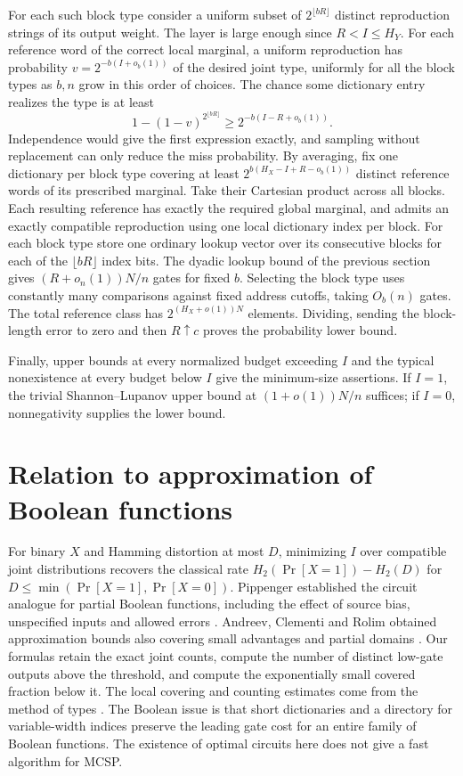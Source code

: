 \documentclass[11pt]{article}
\begin{document}
For each such block type consider a uniform subset of $2^{\lfloor bR\rfloor}$ distinct reproduction strings of its output weight. The layer is large enough since $R<I\le H_Y$. For each reference word of the correct local marginal, a uniform reproduction has probability $v=2^{-b(I+o_b(1))}$ of the desired joint type, uniformly for all the block types as $b,n$ grow in this order of choices. The chance some dictionary entry realizes the type is at least
\[
    1-(1-v)^{2^{\lfloor bR\rfloor}}\ge 2^{-b(I-R+o_b(1))}.
\]
Independence would give the first expression exactly, and sampling without replacement can only reduce the miss probability. By averaging, fix one dictionary per block type covering at least $2^{b(H_X-I+R-o_b(1))}$ distinct reference words of its prescribed marginal. Take their Cartesian product across all blocks. Each resulting reference has exactly the required global marginal, and admits an exactly compatible reproduction using one local dictionary index per block. For each block type store one ordinary lookup vector over its consecutive blocks for each of the $\lfloor bR\rfloor$ index bits. The dyadic lookup bound of the previous section gives $(R+o_n(1))N/n$ gates for fixed $b$. Selecting the block type uses constantly many comparisons against fixed address cutoffs, taking $O_b(n)$ gates. The total reference class has $2^{(H_X+o(1))N}$ elements. Dividing, sending the block-length error to zero and then $R\uparrow c$ proves the probability lower bound.

Finally, upper bounds at every normalized budget exceeding $I$ and the typical nonexistence at every budget below $I$ give the minimum-size assertions. If $I=1$, the trivial Shannon--Lupanov upper bound at $(1+o(1))N/n$ suffices; if $I=0$, nonnegativity supplies the lower bound.

\section{Relation to approximation of Boolean functions}
For binary $X$ and Hamming distortion at most $D$, minimizing $I$ over compatible joint distributions recovers the classical rate $H_2(\Pr[X=1])-H_2(D)$ for $D\le\min(\Pr[X=1],\Pr[X=0])$. Pippenger established the circuit analogue for partial Boolean functions, including the effect of source bias, unspecified inputs and allowed errors \cite{pipp}. Andreev, Clementi and Rolim obtained approximation bounds also covering small advantages and partial domains \cite{acr}. Our formulas retain the exact joint counts, compute the number of distinct low-gate outputs above the threshold, and compute the exponentially small covered fraction below it. The local covering and counting estimates come from the method of types \cite{types}. The Boolean issue is that short dictionaries and a directory for variable-width indices preserve the leading gate cost for an entire family of Boolean functions. The existence of optimal circuits here does not give a fast algorithm for MCSP.
\end{document}
